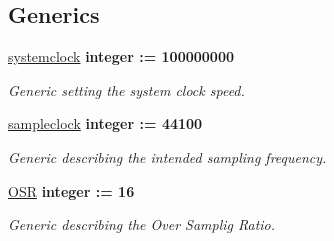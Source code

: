 \subsection*{Generics}
 \begin{DoxyCompactItemize}
\item 
\hypertarget{classclk__divide_a81d31886de4b5afc05873543265dcf7c}{\hyperlink{classclk__divide_a81d31886de4b5afc05873543265dcf7c}{systemclock} {\bfseries {\bfseries \textcolor{comment}{integer}\textcolor{vhdlchar}{ }\textcolor{vhdlchar}{\-:}\textcolor{vhdlchar}{=}\textcolor{vhdlchar}{ } \textcolor{vhdldigit}{100000000} \textcolor{vhdlchar}{ }}}}\label{classclk__divide_a81d31886de4b5afc05873543265dcf7c}

\begin{DoxyCompactList}\small\item\em Generic setting the system clock speed. \end{DoxyCompactList}\item 
\hypertarget{classclk__divide_a046b87df8ce0a99f5bacf19e5027cccf}{\hyperlink{classclk__divide_a046b87df8ce0a99f5bacf19e5027cccf}{sampleclock} {\bfseries {\bfseries \textcolor{comment}{integer}\textcolor{vhdlchar}{ }\textcolor{vhdlchar}{\-:}\textcolor{vhdlchar}{=}\textcolor{vhdlchar}{ } \textcolor{vhdldigit}{44100} \textcolor{vhdlchar}{ }}}}\label{classclk__divide_a046b87df8ce0a99f5bacf19e5027cccf}

\begin{DoxyCompactList}\small\item\em Generic describing the intended sampling frequency. \end{DoxyCompactList}\item 
\hypertarget{classclk__divide_aeab4f828c7bc0927792f6a9c6bf1b63f}{\hyperlink{classclk__divide_aeab4f828c7bc0927792f6a9c6bf1b63f}{O\-S\-R} {\bfseries {\bfseries \textcolor{comment}{integer}\textcolor{vhdlchar}{ }\textcolor{vhdlchar}{\-:}\textcolor{vhdlchar}{=}\textcolor{vhdlchar}{ } \textcolor{vhdldigit}{16} \textcolor{vhdlchar}{ }}}}\label{classclk__divide_aeab4f828c7bc0927792f6a9c6bf1b63f}

\begin{DoxyCompactList}\small\item\em Generic describing the Over Samplig Ratio. \end{DoxyCompactList}\end{DoxyCompactItemize}
